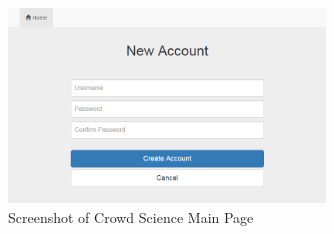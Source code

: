 \begin{figure}[tbh]
\begin{center}
\includegraphics[width=0.75\textwidth]{./Images/prototype_register.png}
\end{center}
\caption{Screenshot of Crowd Science Main Page\label{prototype_register}}
\end{figure}